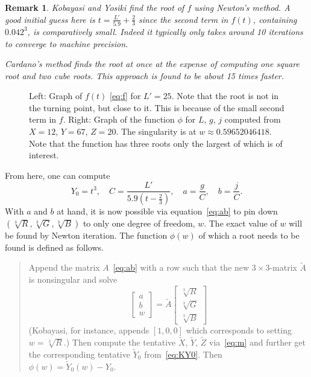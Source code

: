 \documentclass{scrartcl}
\newtheorem*{remark}{Remark}
\theoremstyle{named}
\begin{document}
\begin{remark}
  Kobayasi and Yosiki find the root of $f$ using Newton's method.  A good initial
  guess here is $t = \frac{L'}{5.9} + \frac{2}{3}$ since the second term in $f(t)$,
  containing $0.042^3$, is comparatively small. Indeed it typically only takes around 10
  iterations to converge to machine precision.

  Cardano's method finds the root at once at the expense of computing one square root
  and two cube roots. This approach is found to be about 15 times faster.
\end{remark}


\begin{figure}
  \centering
  \hfill
  
  \hfill
  
  \hfill
  \caption{Left: Graph of $f(t)$ \eqref{eq:f} for $L'=25$. Note that the root is not in
  the turning point, but close to it. This is because of the small second term in $f$.
  Right: Graph of the function $\phi$ for $L$, $g$, $j$ computed from $X=12$, $Y=67$,
  $Z=20$. The singularity is at $w\approx 0.59652046418$.  Note that the function has
  three roots only the largest of which is of interest.}\label{fig:singularity}
\end{figure}

From here, one can compute
\begin{equation}\label{eq:gather}
  Y_0 = t^3,\quad
  C = \frac{L'}{5.9 \left(t - \frac{2}{3}\right)},\quad
  a = \frac{g}{C},\quad
  b = \frac{j}{C}.
\end{equation}
With $a$ and $b$ at hand, it is now possible via equation~\eqref{eq:ab} to pin down
$(\sqrt[3]{R}, \sqrt[3]{G}, \sqrt[3]{B})$ to only one degree of freedom, $w$.
The exact value of $w$ will be found by Newton iteration. The function $\phi(w)$
of which a root needs to be found is defined as follows.
\begin{quotation}
  Append the matrix $A$~\eqref{eq:ab} with a row such that the new $3\times3$-matrix
  $\tilde{A}$ is nonsingular and solve
  \[
    \begin{bmatrix}
      a\\
      b\\
      w
    \end{bmatrix}
    =
    \tilde{A}
    \begin{bmatrix}
      \sqrt[3]{R}\\
      \sqrt[3]{G}\\
      \sqrt[3]{B}
    \end{bmatrix}
  \]
  (Kobayasi, for instance, appends $[1, 0, 0]$ which corresponds to setting
  $w=\sqrt[3]{R}$.) Then compute the tentative $\tilde{X}$, $\tilde{Y}$, $\tilde{Z}$
  via~\eqref{eq:m} and further get the corresponding tentative $\tilde{Y}_0$
  from~\eqref{eq:KY0}. Then $\phi(w) = \tilde{Y}_0(w) - Y_0$.
\end{quotation}
\end{document}
